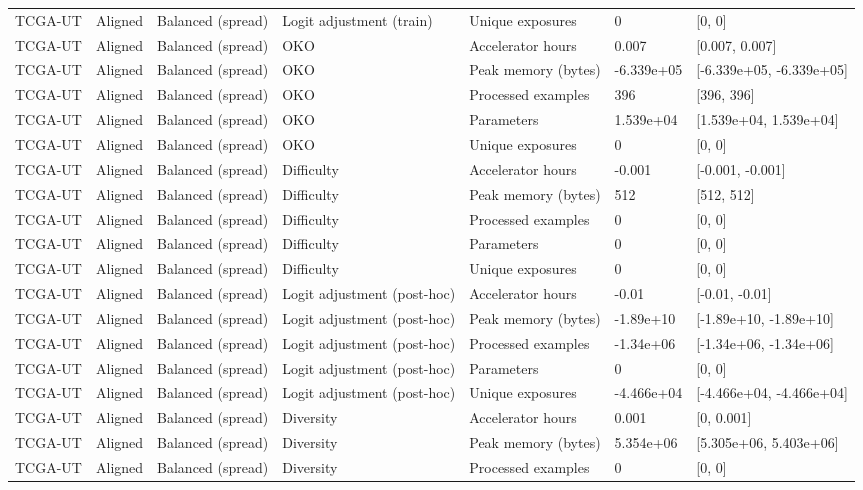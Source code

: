 \begin{longtable}{lllllll}
TCGA-UT & Aligned & Balanced (spread) & Logit adjustment (train) & Unique exposures & 0 & [0, 0] \\
TCGA-UT & Aligned & Balanced (spread) & OKO & Accelerator hours & 0.007 & [0.007, 0.007] \\
TCGA-UT & Aligned & Balanced (spread) & OKO & Peak memory (bytes) & -6.339e+05 & [-6.339e+05, -6.339e+05] \\
TCGA-UT & Aligned & Balanced (spread) & OKO & Processed examples & 396 & [396, 396] \\
TCGA-UT & Aligned & Balanced (spread) & OKO & Parameters & 1.539e+04 & [1.539e+04, 1.539e+04] \\
TCGA-UT & Aligned & Balanced (spread) & OKO & Unique exposures & 0 & [0, 0] \\
TCGA-UT & Aligned & Balanced (spread) & Difficulty & Accelerator hours & -0.001 & [-0.001, -0.001] \\
TCGA-UT & Aligned & Balanced (spread) & Difficulty & Peak memory (bytes) & 512 & [512, 512] \\
TCGA-UT & Aligned & Balanced (spread) & Difficulty & Processed examples & 0 & [0, 0] \\
TCGA-UT & Aligned & Balanced (spread) & Difficulty & Parameters & 0 & [0, 0] \\
TCGA-UT & Aligned & Balanced (spread) & Difficulty & Unique exposures & 0 & [0, 0] \\
TCGA-UT & Aligned & Balanced (spread) & Logit adjustment (post-hoc) & Accelerator hours & -0.01 & [-0.01, -0.01] \\
TCGA-UT & Aligned & Balanced (spread) & Logit adjustment (post-hoc) & Peak memory (bytes) & -1.89e+10 & [-1.89e+10, -1.89e+10] \\
TCGA-UT & Aligned & Balanced (spread) & Logit adjustment (post-hoc) & Processed examples & -1.34e+06 & [-1.34e+06, -1.34e+06] \\
TCGA-UT & Aligned & Balanced (spread) & Logit adjustment (post-hoc) & Parameters & 0 & [0, 0] \\
TCGA-UT & Aligned & Balanced (spread) & Logit adjustment (post-hoc) & Unique exposures & -4.466e+04 & [-4.466e+04, -4.466e+04] \\
TCGA-UT & Aligned & Balanced (spread) & Diversity & Accelerator hours & 0.001 & [0, 0.001] \\
TCGA-UT & Aligned & Balanced (spread) & Diversity & Peak memory (bytes) & 5.354e+06 & [5.305e+06, 5.403e+06] \\
TCGA-UT & Aligned & Balanced (spread) & Diversity & Processed examples & 0 & [0, 0] \\

\end{longtable}
